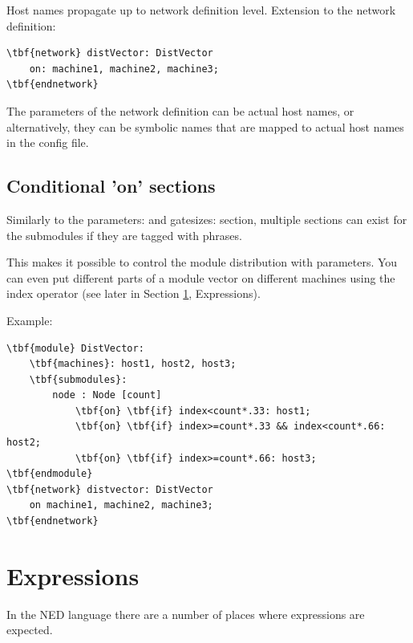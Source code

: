 Host names propagate up to network definition level. Extension 
to the network definition:


\begin{Verbatim}[commandchars=\\\{\}]
\tbf{network} distVector: DistVector
    on: machine1, machine2, machine3;
\tbf{endnetwork}
\end{Verbatim}



The  parameters of the network definition
can be actual host names, or alternatively, they can be symbolic names
that are mapped to actual host names in the config file.





\subsection{Conditional 'on' sections}

Similarly to the parameters: and gatesizes: section, multiple
 sections can exist for the submodules if
they are tagged with  phrases.

This makes it possible to control the module distribution with
parameters. You can even put different parts of a module vector on
different machines using the index operator (see
later in Section \ref{ch-ned-lang:sec:expressions}, Expressions).

Example:


\begin{Verbatim}[commandchars=\\\{\}]
\tbf{module} DistVector:
    \tbf{machines}: host1, host2, host3;
    \tbf{submodules}:
        node : Node [count]
            \tbf{on} \tbf{if} index<count*.33: host1;
            \tbf{on} \tbf{if} index>=count*.33 && index<count*.66: host2;
            \tbf{on} \tbf{if} index>=count*.66: host3;
\tbf{endmodule}
\tbf{network} distvector: DistVector
    on machine1, machine2, machine3;
\tbf{endnetwork}
\end{Verbatim}






\section{Expressions}
\label{ch-ned-lang:sec:expressions}

In the NED language there are a number of places where
expressions are expected.


